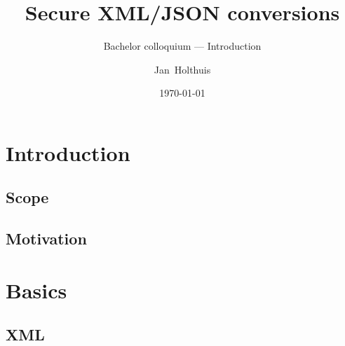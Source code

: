 \documentclass[
    alternativetitlepage=bild,
    cornerlogo=hgi_nds_logo2,
    sectionoverview,
]{rubpresentation}
\title[XML/JSON conversions]
{Secure XML/JSON conversions}
\subtitle{Bachelor colloquium --- Introduction}
\author[Holthuis]{Jan~Holthuis}
\institute[Ruhr-Uni Bochum]
{%
Chair for Net- and Data Security\\
Ruhr-University of Bochum
}
\date%
{\today}
\begin{document}
\frame[plain]{\titlepage}



\section{Introduction}

\subsection{Scope}


\subsection{Motivation}


\section{Basics}

\subsection{XML}
\end{document}
